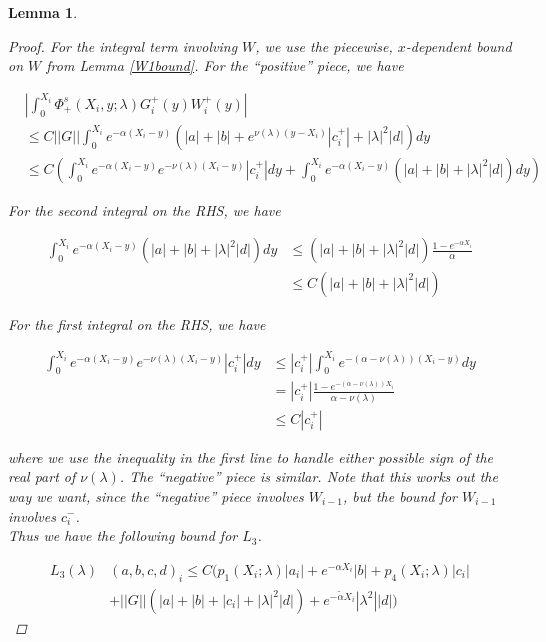 \documentclass[12pt]{article}
\newtheorem{lemma}{Lemma}
\begin{document}
\begin{lemma}
\begin{proof}
For the integral term involving $W$, we use the piecewise, $x$-dependent bound on $W$ from Lemma \ref{W1bound}. For the ``positive'' piece, we have

\begin{align*}
&\left| \int_0^{X_i} \Phi^s_+(X_i, y; \lambda) G_i^+(y) W_i^+(y) \right| \\
&\leq C ||G|| \int_0^{X_i} e^{-\alpha(X_i - y)}(|a| + |b| + e^{\nu(\lambda)(y - X_i)}|c_i^+| + |\lambda|^2 |d| ) dy \\
&\leq C \left( \int_0^{X_i} e^{-\alpha(X_i - y)}e^{-\nu(\lambda)(X_i - y)}|c_i^+|dy + \int_0^{X_i} e^{-\alpha(X_i - y)}(|a| + |b| + |\lambda|^2 |d| ) dy \right)
\end{align*}

For the second integral on the RHS, we have

\begin{align*}
\int_0^{X_i} e^{-\alpha(X_i - y)}(|a| + |b| + |\lambda|^2 |d| ) dy &\leq (|a| + |b| + |\lambda|^2 |d|)\frac{1 - e^{-\alpha X_i}}{\alpha} \\
&\leq C (|a| + |b| + |\lambda|^2 |d|)
\end{align*}

For the first integral on the RHS, we have

\begin{align*}
\int_0^{X_i} e^{-\alpha(X_i - y)}e^{-\nu(\lambda)(X_i - y)}|c_i^+|dy &\leq
|c_i^+| \int_0^{X_i} e^{-(\alpha - \nu(\lambda))(X_i - y)} dy \\
&= |c_i^+| \frac{1 - e^{-(\alpha - \nu(\lambda)) X_i}}{\alpha - \nu(\lambda)} \\
&\leq C |c_i^+| 
\end{align*}

where we use the inequality in the first line to handle either possible sign of the real part of $\nu(\lambda)$. The ``negative'' piece is similar. Note that this works out the way we want, since the ``negative'' piece involves $W_{i-1}$, but the bound for $W_{i-1}$ involves $c_i^-$.\\

Thus we have the following bound for $L_3$.

\begin{align*}
L_3(\lambda)&(a, b, c, d)_i \leq C ( p_1(X_i; \lambda)|a_i|
+ e^{-\alpha X_i}|b| + p_4(X_i; \lambda)|c_i| \\
&+ ||G|| (|a| + |b| + |c_i| + |\lambda|^2|d|) + e^{-\tilde{\alpha} X_i} |\lambda^2| |d| )
\end{align*}


\end{proof}
\end{lemma}
\end{document}
